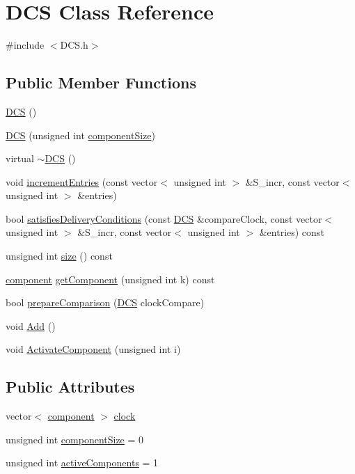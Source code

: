 \hypertarget{class_d_c_s}{}\section{D\+CS Class Reference}
\label{class_d_c_s}


{\ttfamily \#include $<$D\+C\+S.\+h$>$}

\subsection*{Public Member Functions}
\begin{DoxyCompactItemize}
\item 
\hyperlink{class_d_c_s_a9b4fbb5c80ef6b265669082703312cd6}{D\+CS} ()
\item 
\hyperlink{class_d_c_s_ad923153aa60c70d718c1be1b47e45a61}{D\+CS} (unsigned int \hyperlink{class_d_c_s_af256dc5d9b30241bfce2e12d57824bec}{component\+Size})
\item 
virtual \hyperlink{class_d_c_s_a7e6e0c1df0b016e246801b4347f3a208}{$\sim$\+D\+CS} ()
\item 
void \hyperlink{class_d_c_s_a7e537421b8edf48c1d00c859c9be53da}{increment\+Entries} (const vector$<$ unsigned int $>$ \&S\+\_\+incr, const vector$<$ unsigned int $>$ \&entries)
\item 
bool \hyperlink{class_d_c_s_aeb765d2361e829ba54620d99e2fb4bf1}{satisfies\+Delivery\+Conditions} (const \hyperlink{class_d_c_s}{D\+CS} \&compare\+Clock, const vector$<$ unsigned int $>$ \&S\+\_\+incr, const vector$<$ unsigned int $>$ \&entries) const
\item 
unsigned int \hyperlink{class_d_c_s_ac428129bbebba59be9a09c09c1096323}{size} () const
\item 
\hyperlink{_d_c_s_8h_aff5561f7728e7d2c203fbfeac4a73866}{component} \hyperlink{class_d_c_s_af1f82450ff5c80deff0fb2d270bf6276}{get\+Component} (unsigned int k) const
\item 
bool \hyperlink{class_d_c_s_a8d66ffc382de5519aa7fb3844b6790af}{prepare\+Comparison} (\hyperlink{class_d_c_s}{D\+CS} clock\+Compare)
\item 
void \hyperlink{class_d_c_s_a8d3778638a4104c2c41569aca7ed17b1}{Add} ()
\item 
void \hyperlink{class_d_c_s_a3c4c817b466389070cb7d8051c2ec38f}{Activate\+Component} (unsigned int i)
\end{DoxyCompactItemize}
\subsection*{Public Attributes}
\begin{DoxyCompactItemize}
\item 
vector$<$ \hyperlink{_d_c_s_8h_aff5561f7728e7d2c203fbfeac4a73866}{component} $>$ \hyperlink{class_d_c_s_adde0f06e934657f25a92b13e04d3fd7d}{clock}
\item 
unsigned int \hyperlink{class_d_c_s_af256dc5d9b30241bfce2e12d57824bec}{component\+Size} = 0
\item 
unsigned int \hyperlink{class_d_c_s_a0922c1733e23bf6098b71890da57e762}{active\+Components} = 1
\end{DoxyCompactItemize}


